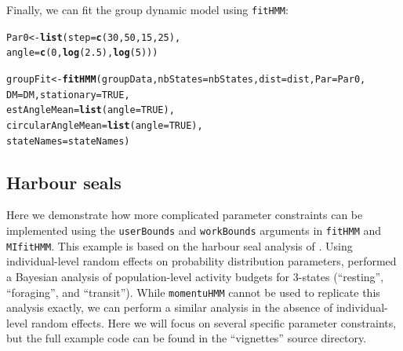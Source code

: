 \documentclass[12pt]{article}\usepackage[]{graphicx}\usepackage[]{color}
\makeatletter
\newcommand{\hlnum}[1]{\textcolor[rgb]{0.686,0.059,0.569}{#1}}%
\newcommand{\hlstd}[1]{\textcolor[rgb]{0.345,0.345,0.345}{#1}}%
\newcommand{\hlkwb}[1]{\textcolor[rgb]{0.69,0.353,0.396}{#1}}%
\newcommand{\hlkwc}[1]{\textcolor[rgb]{0.333,0.667,0.333}{#1}}%
\newcommand{\hlkwd}[1]{\textcolor[rgb]{0.737,0.353,0.396}{\textbf{#1}}}%
\newenvironment{kframe}{%
 \def\at@end@of@kframe{}%
 \ifinner\ifhmode%
  \def\at@end@of@kframe{\end{minipage}}%
  \begin{minipage}{\columnwidth}%
 \fi\fi%
 \def\FrameCommand##1{\hskip\@totalleftmargin \hskip-\fboxsep
 \colorbox{shadecolor}{##1}\hskip-\fboxsep
     \hskip-\linewidth \hskip-\@totalleftmargin \hskip\columnwidth}%
 \MakeFramed {\advance\hsize-\width
   \@totalleftmargin\z@ \linewidth\hsize
   \@setminipage}}%
 {\par\unskip\endMakeFramed%
 \at@end@of@kframe}
\newenvironment{knitrout}{}{} %
\makeatother
\begin{document}
Finally, we can fit the group dynamic model using \verb|fitHMM|:
\begin{knitrout}
\color{fgcolor}\begin{kframe}
\begin{alltt}
\hlstd{Par0} \hlkwb{<-} \hlkwd{list}\hlstd{(}\hlkwc{step} \hlstd{=} \hlkwd{c}\hlstd{(}\hlnum{30}\hlstd{,}\hlnum{50}\hlstd{,}\hlnum{15}\hlstd{,}\hlnum{25}\hlstd{),}
             \hlkwc{angle} \hlstd{=} \hlkwd{c}\hlstd{(}\hlnum{0}\hlstd{,}\hlkwd{log}\hlstd{(}\hlnum{2.5}\hlstd{),}\hlkwd{log}\hlstd{(}\hlnum{5}\hlstd{)))}

\hlstd{groupFit} \hlkwb{<-} \hlkwd{fitHMM}\hlstd{(groupData,} \hlkwc{nbStates}\hlstd{=nbStates,} \hlkwc{dist}\hlstd{=dist,} \hlkwc{Par}\hlstd{=Par0,}
                   \hlkwc{DM} \hlstd{= DM,} \hlkwc{stationary} \hlstd{=} \hlnum{TRUE}\hlstd{,}
                   \hlkwc{estAngleMean} \hlstd{=} \hlkwd{list}\hlstd{(}\hlkwc{angle} \hlstd{=} \hlnum{TRUE}\hlstd{),}
                   \hlkwc{circularAngleMean} \hlstd{=} \hlkwd{list}\hlstd{(}\hlkwc{angle} \hlstd{=} \hlnum{TRUE}\hlstd{),}
                   \hlkwc{stateNames} \hlstd{= stateNames)}
\end{alltt}
\end{kframe}
\end{knitrout}

\subsection{Harbour seals}
\label{sec:harbourSeal}
Here we demonstrate how more complicated parameter constraints can be implemented using the \verb|userBounds| and \verb|workBounds| arguments in \verb|fitHMM| and \verb|MIfitHMM|. This example is based on the harbour seal analysis of \cite{McClintockEtAl2013c}. Using individual-level random effects on probability distribution parameters, \cite{McClintockEtAl2013c} performed a Bayesian analysis of population-level activity budgets for 3-states (``resting'', ``foraging'', and ``transit''). While \verb|momentuHMM| cannot be used to replicate this analysis exactly, we can perform a similar analysis in the absence of individual-level random effects. Here we will focus on several specific parameter constraints, but the full example code can be found in the ``vignettes'' source directory. 
\end{document}
